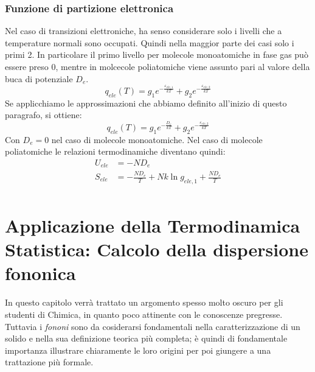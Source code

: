 \documentclass[oneside]{amsbook}
\numberwithin{section}{chapter}
\numberwithin{equation}{section}
\numberwithin{figure}{section}
\begin{document}
\subsection{Funzione di partizione elettronica}
Nel caso di transizioni elettroniche, ha senso considerare solo i livelli che a temperature normali sono occupati. Quindi nella maggior parte dei casi solo i primi 2.
In particolare il primo livello per molecole monoatomiche in fase gas può essere preso 0, mentre in molcecole poliatomiche viene assunto pari al valore della buca di potenziale $D_e$.
\begin{equation}
q_{ele}(T)=g_1 e^{-\frac{\varepsilon_{ele,1}}{kT}}+g_2 e^{-\frac{\varepsilon_{ele,2}}{kT}}
\end{equation}
Se applicchiamo le approssimazioni che abbiamo definito all'inizio di questo paragrafo, si ottiene:
\begin{equation}
q_{ele}(T)=g_1 e^{-\frac{D_e}{kT}}+g_2 e^{-\frac{\varepsilon_{ele,2}}{kT}}
\end{equation}
Con $D_e=0$ nel caso di molecole monoatomiche.
Nel caso di molecole poliatomiche le relazioni termodinamiche diventano quindi:
\begin{equation}
\begin{aligned}
U_{ele}&=-ND_e\\
S_{ele}&=-\frac{ND_e}{T}+Nk\ln g_{ele,1}+\frac{ND_e}{T}\\
\end{aligned}
\end{equation}
\chapter{Applicazione della Termodinamica Statistica: Calcolo della dispersione fononica}
In questo capitolo verrà trattato un argomento spesso molto oscuro per gli studenti di Chimica, in quanto poco attinente con le conoscenze pregresse. Tuttavia i \emph{fononi} sono da cosiderarsi fondamentali nella caratterizzazione di un solido e nella sua definizione teorica più completa; è quindi di fondamentale importanza illustrare chiaramente le loro origini per poi giungere a una trattazione più formale.
\end{document}
